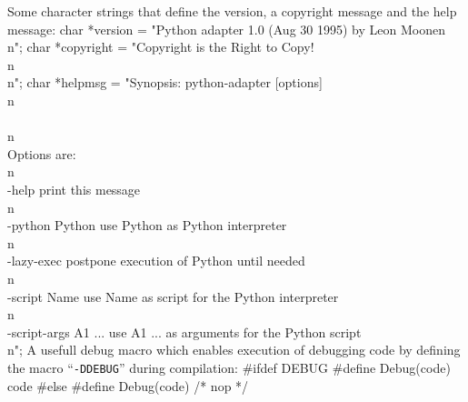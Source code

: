 Some character strings that define the version, a copyright message 
and the help message:
\nwenddocs{}\endmoddef\let\nwnotused=\nwoutput{}\nwstartdeflinemarkup{}\nwenddeflinemarkup
char *version   = "Python adapter 1.0 (Aug 30 1995) by Leon Moonen\\n";
char *copyright = "Copyright is the Right to Copy!\\n\\n";
char *helpmsg   = "Synopsis: python-adapter [options]\\n\\
\\n\\
Options are:\\n\\
-help                 print this message\\n\\
-python Python        use Python as Python interpreter\\n\\
-lazy-exec            postpone execution of Python until needed\\n\\
-script Name          use Name as script for the Python interpreter\\n\\
-script-args A1 ...   use A1 ... as arguments for the Python script\\n";
\nwendcode{}\nwdocspar
A usefull debug macro which enables execution of debugging code by
defining the macro ``\texttt{-DDEBUG}'' during compilation:
\nwenddocs{}\plusendmoddef\let\nwnotused=\nwoutput{}\nwstartdeflinemarkup{}\nwenddeflinemarkup
#ifdef DEBUG
#define Debug(code)     code
#else
#define Debug(code)     /* nop */
